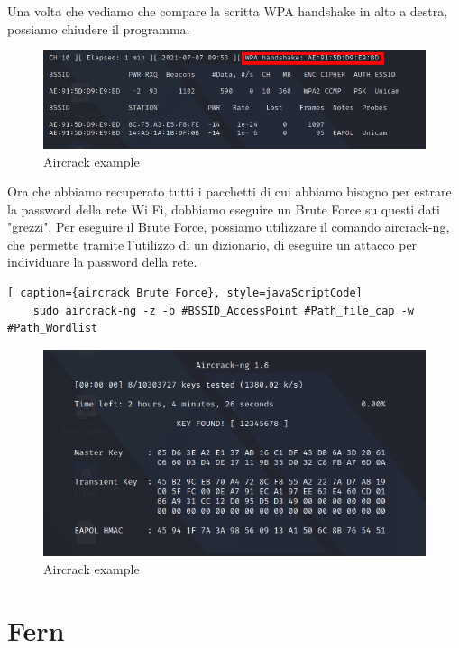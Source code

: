 Una volta che vediamo che compare la scritta WPA handshake in alto a destra, possiamo chiudere il programma.

\begin{figure}[ht]
    \centering
    \includegraphics[width=\linewidth]{Immagini/6/aircrack_5.png}
    \caption{Aircrack example}
    \label{fig:Aircrack example}
\end{figure}

Ora che abbiamo recuperato tutti i pacchetti di cui abbiamo bisogno per estrare la password della rete Wi Fi, dobbiamo eseguire un Brute Force su questi dati "grezzi". Per eseguire il Brute Force, possiamo utilizzare il comando aircrack-ng, che permette tramite l'utilizzo di un dizionario, di eseguire un attacco per individuare la password della rete.

\begin{lstlisting}[ caption={aircrack Brute Force}, style=javaScriptCode]
    sudo aircrack-ng -z -b #BSSID_AccessPoint #Path_file_cap -w #Path_Wordlist
\end{lstlisting}

\begin{figure}[ht]
    \centering
    \includegraphics[width=\linewidth]{Immagini/6/ircrack_6.png}
    \caption{Aircrack example}
    \label{fig:Aircrack example}
\end{figure}

\newpage

\section{Fern}

